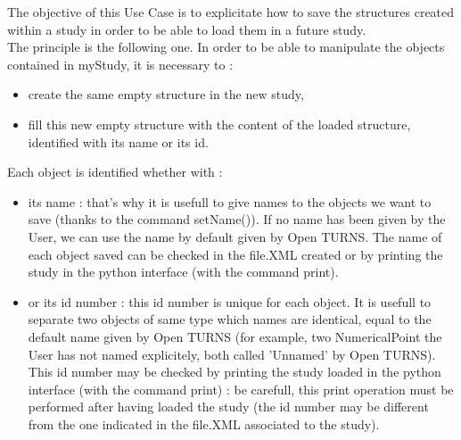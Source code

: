 \renewcommand{\filename}{docUC_LoadSave_Load.tex}
\renewcommand{\filetitle}{UC : How to load a study ?}

\HeaderIILevel



The objective of this Use Case is to explicitate how to save the structures created within a study in order to be able to load them in a future study.\\


The principle is the following one. In order to be able to manipulate the objects contained in myStudy, it is necessary to :
\begin{itemize}
\item create the same empty structure in the new study,
\item fill this new empty structure with the content of the loaded structure, identified with its name or its id.
\end{itemize}

Each object is identified whether with :
\begin{itemize}
\item its name : that's why it is usefull to give names to the objects we want to save (thanks to the command setName()). If no name has been given by the User, we can use the name by default given by Open TURNS. The name of each object saved can be checked in the file.XML created or by printing the study in the python interface (with the command print).
\item or its id number : this id number is unique for each object. It is usefull to separate two objects of same type which names are identical, equal to the default name given by Open TURNS (for example, two NumericalPoint the User has not named explicitely, both called 'Unnamed' by Open TURNS). This id number may be checked by printing the study loaded in the python interface (with the command print) : be carefull, this print operation must be performed after having loaded the study (the id number may be different from the one indicated in the file.XML associated to the study).
\end{itemize}

